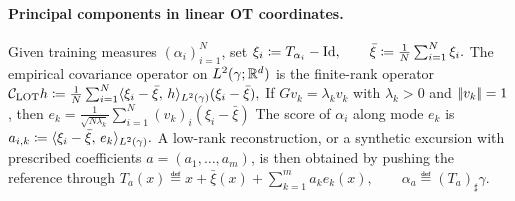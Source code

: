 \paragraph{Principal components in linear OT coordinates.}
Given training measures \((\alpha_i)_{i=1}^N\), set
\(\xi_i \coloneqq T_{\alpha_i}-\mathrm{Id}, \qquad \bar\xi \coloneqq \frac1N\sum_{i=1}^N \xi_i.\)
The empirical covariance operator on \(L^2(\gamma;\mathbb{R}^d)\) is the finite-rank operator
\(\mathcal C_{\operatorname{LOT}} h \coloneqq \frac1N\sum_{i=1}^N \langle \xi_i-\bar\xi,\,h\rangle_{L^2(\gamma)} (\xi_i-\bar\xi),\)
If \(Gv_k=\lambda_k v_k\) with \(\lambda_k>0\) and \(|\!| v_k |\!|=1\), then
\(e_k=\frac{1}{\sqrt{N\lambda_k}}\sum_{i=1}^N (v_k)_i(\xi_i-\bar\xi)\)
The score of \(\alpha_i\) along mode \(e_k\) is \(a_{i,k} \coloneqq \langle \xi_i-\bar\xi,\,e_k\rangle_{L^2(\gamma)}.\)
A low-rank reconstruction, or a synthetic excursion with prescribed coefficients \(a=(a_1,\ldots,a_m)\), is then obtained by pushing the reference through
\(T_a(x) \eqdef x+\bar\xi(x)+\sum_{k=1}^m a_k e_k(x), \qquad \alpha_a \eqdef (T_a)_\sharp\gamma.\)
